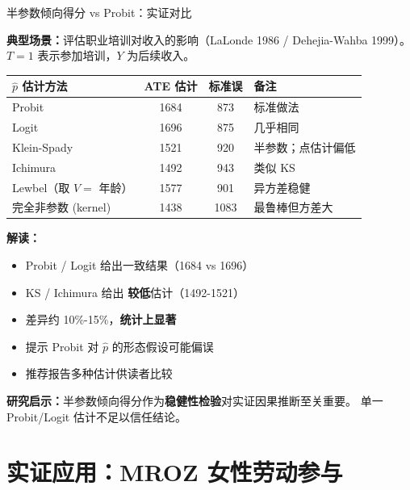 \documentclass[aspectratio=169, 10pt]{beamer}
\begin{document}
\begin{frame}{半参数倾向得分 vs Probit：实证对比}

  \textbf{典型场景：}评估职业培训对收入的影响（LaLonde 1986 / Dehejia-Wahba 1999）。
  $T = 1$ 表示参加培训，$Y$ 为后续收入。

  \begin{center}\footnotesize
  \begin{tabular}{p{3.5cm}|c|c|p{4cm}}
  \hline
  $\hat p$ 估计方法 & ATE 估计 & 标准误 & 备注 \\
  \hline
  Probit & 1684 & 873 & 标准做法 \\
  Logit & 1696 & 875 & 几乎相同 \\
  Klein-Spady & 1521 & 920 & 半参数；点估计偏低 \\
  Ichimura & 1492 & 943 & 类似 KS \\
  Lewbel（取 $V=$ 年龄）& 1577 & 901 & 异方差稳健 \\
  完全非参数 (kernel) & 1438 & 1083 & 最鲁棒但方差大 \\
  \hline
  \end{tabular}
  \end{center}

  \begin{highlightbox}
    \textbf{解读：}
    \begin{itemize}\setlength{\itemsep}{1pt}
      \item Probit / Logit 给出一致结果（1684 vs 1696）
      \item KS / Ichimura 给出 \textbf{较低}估计（1492-1521）
      \item 差异约 10\%-15\%，\textbf{统计上显著}
      \item 提示 Probit 对 $\hat p$ 的形态假设可能偏误
      \item 推荐报告多种估计供读者比较
    \end{itemize}
  \end{highlightbox}

  \begin{keybox}
    \textbf{研究启示：}半参数倾向得分作为\textbf{稳健性检验}对实证因果推断至关重要。
    单一 Probit/Logit 估计不足以信任结论。
  \end{keybox}

\end{frame}

\section{实证应用：MROZ 女性劳动参与}
\end{document}
